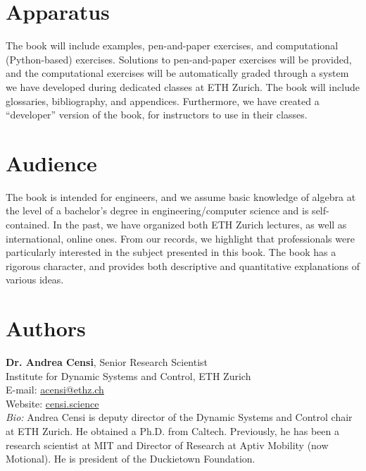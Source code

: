 \documentclass[10pt, article, one side]{memoir}
\begin{document}
    \section{Apparatus}
    The book will include examples, pen-and-paper exercises, and computational (Python-based) exercises.
    Solutions to pen-and-paper exercises will be provided, and the computational exercises will be automatically graded through a system we have developed during dedicated classes at ETH Zurich.
    The book will include glossaries, bibliography, and appendices.
    Furthermore, we have created a “developer” version of the book, for instructors to use in their classes.

    \section{Audience}
    The book is intended for engineers, and we assume basic knowledge of algebra at the level of a bachelor’s degree in engineering/computer science and is self-contained.
    In the past, we have organized both ETH Zurich lectures, as well as international, online ones.
    From our records, we highlight that professionals were particularly interested in the subject presented in this book.
    The book has a rigorous character, and provides both descriptive and quantitative explanations of various ideas.

    \section{Authors}
    \noindent \textbf{Dr.
        Andrea Censi}, Senior Research Scientist\\
    Institute for Dynamic Systems and Control, ETH Zurich\\
    E-mail: \href{mailto:acensi@ethz.ch}{acensi@ethz.ch}\\
    Website: \href{https://censi.science}{censi.science}\\
    \emph{Bio:} Andrea Censi is deputy director of the Dynamic Systems and Control chair at ETH Zurich.
    He obtained a Ph.D.
    from Caltech.
    Previously, he has been a research scientist at MIT and Director of Research at Aptiv Mobility (now Motional).
    He is president of the Duckietown Foundation.
    \\
\end{document}
